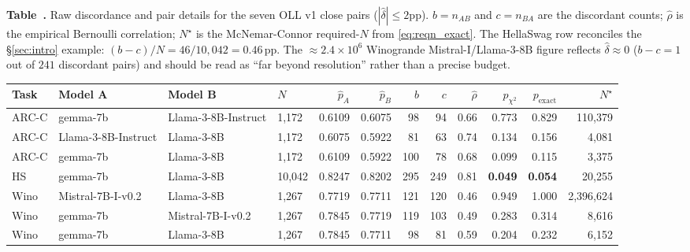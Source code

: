 \documentclass{article}
\theoremstyle{plain}
\theoremstyle{definition}
\begin{document}
\label{tab:discord_oll}%
\begin{center}\footnotesize\vspace{-1ex}
\textbf{Table~\thetable.} Raw discordance and pair details for the seven OLL v1 close pairs ($|\hat\delta|\le 2$pp). $b{=}n_{AB}$ and $c{=}n_{BA}$ are the discordant counts; $\hat\rho$ is the empirical Bernoulli correlation; $N^{\star}$ is the McNemar-Connor required-$N$ from \cref{eq:reqn_exact}. The HellaSwag row reconciles the \S\ref{sec:intro} example: $(b-c)/N = 46/10{,}042 = 0.46$\,pp. The $\approx 2.4{\times}10^{6}$ Winogrande Mistral-I/Llama-3-8B figure reflects $\hat\delta \approx 0$ ($b-c = 1$ out of $241$ discordant pairs) and should be read as ``far beyond resolution'' rather than a precise budget.\\[3pt]
\setlength{\tabcolsep}{4pt}
\begin{tabular}{@{}llllrrrrrrrr@{}}
\toprule
Task & Model A & Model B & $N$ & $\hat p_A$ & $\hat p_B$ & $b$ & $c$ & $\hat\rho$ & $p_{\chi^2}$ & $p_{\mathrm{exact}}$ & $N^{\star}$ \\
\midrule
ARC-C & gemma-7b           & Llama-3-8B-Instruct & 1{,}172 & 0.6109 & 0.6075 & 98  & 94  & 0.66 & 0.773 & 0.829 & 110{,}379 \\
ARC-C & Llama-3-8B-Instruct & Llama-3-8B          & 1{,}172 & 0.6075 & 0.5922 & 81  & 63  & 0.74 & 0.134 & 0.156 & 4{,}081 \\
ARC-C & gemma-7b           & Llama-3-8B          & 1{,}172 & 0.6109 & 0.5922 & 100 & 78  & 0.68 & 0.099 & 0.115 & 3{,}375 \\
HS    & gemma-7b           & Llama-3-8B          & 10{,}042 & 0.8247 & 0.8202 & 295 & 249 & 0.81 & \textbf{0.049} & \textbf{0.054} & 20{,}255 \\
Wino  & Mistral-7B-I-v0.2  & Llama-3-8B          & 1{,}267 & 0.7719 & 0.7711 & 121 & 120 & 0.46 & 0.949 & 1.000 & 2{,}396{,}624 \\
Wino  & gemma-7b           & Mistral-7B-I-v0.2   & 1{,}267 & 0.7845 & 0.7719 & 119 & 103 & 0.49 & 0.283 & 0.314 & 8{,}616 \\
Wino  & gemma-7b           & Llama-3-8B          & 1{,}267 & 0.7845 & 0.7711 & 98  & 81  & 0.59 & 0.204 & 0.232 & 6{,}152 \\
\bottomrule
\end{tabular}
\end{center}
\end{document}
